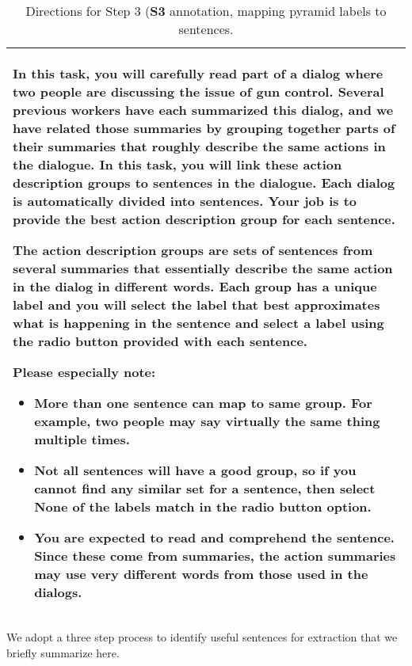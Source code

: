 \documentclass[11pt]{article}
\begin{document}
\begin{table*}
{\begin{tabular}{|p{6.1in}|} \hline
	\small
In this task, you will carefully read part of a dialog where two people are discussing the issue of gun control. Several previous workers have each summarized this dialog, and we have related those summaries by grouping together parts of their summaries that roughly describe the same actions in the dialogue. In this task, you will link these action description groups to sentences in the dialogue.
Each dialog is automatically divided into sentences. Your job is to provide the best action description group for each sentence.

The action description groups are sets of sentences from several summaries that essentially describe the same action in the dialog in different words. Each group has a unique label and you will select the label that best approximates what is happening in the sentence and select a label using the radio button provided with each sentence. 

Please especially note:
\begin{itemize}[noitemsep,topsep=0pt,parsep=0pt,partopsep=0pt,leftmargin=*]
\item More than one sentence can map to same group. For example, two people may say virtually the same thing multiple times. 
\item Not all sentences will have a good group, so if you cannot find any similar set for a sentence, then select None of the labels match in the radio button option.
\item You are expected to read and comprehend the sentence. Since these come from summaries, the action summaries may use very different words from those used in the dialogs. 
\end{itemize}
\\  \hline

\end{tabular}}
\caption{\label{hit-dirs} Directions for Step 3 ({\bf S3} annotation, mapping pyramid labels to sentences.}
\end{table*}


We adopt a three step process to identify useful sentences for
extraction that we briefly summarize here. 
\end{document}
